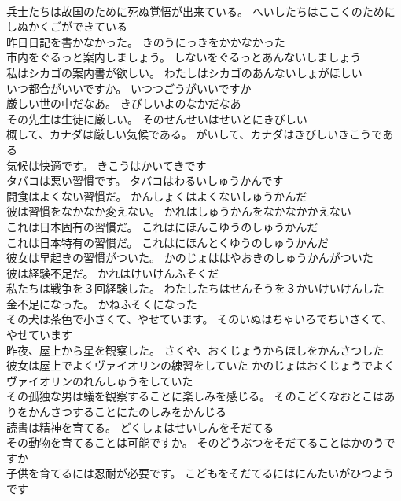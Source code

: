 \documentclass[8pt]{extreport}
\begin{document}
\begin{CJK}{UTF8}{min}
\\	兵士たちは故国のために死ぬ覚悟が出来ている。	へいしたちはここくのためにしぬかくごができている 
\\	昨日日記を書かなかった。	きのうにっきをかかなかった 
\\	市内をぐるっと案内しましょう。	しないをぐるっとあんないしましょう 
\\	私はシカゴの案内書が欲しい。	わたしはシカゴのあんないしょがほしい 
\\	いつ都合がいいですか。	いつつごうがいいですか 
\\	厳しい世の中だなあ。	きびしいよのなかだなあ 
\\	その先生は生徒に厳しい。	そのせんせいはせいとにきびしい 
\\	概して、カナダは厳しい気候である。	がいして、カナダはきびしいきこうである 
\\	気候は快適です。	きこうはかいてきです 
\\	タバコは悪い習慣です。	タバコはわるいしゅうかんです 
\\	間食はよくない習慣だ。	かんしょくはよくないしゅうかんだ 
\\	彼は習慣をなかなか変えない。	かれはしゅうかんをなかなかかえない 
\\	これは日本固有の習慣だ。	これはにほんこゆうのしゅうかんだ 
\\	これは日本特有の習慣だ。	これはにほんとくゆうのしゅうかんだ 
\\	彼女は早起きの習慣がついた。	かのじょははやおきのしゅうかんがついた 
\\	彼は経験不足だ。	かれはけいけんふそくだ 
\\	私たちは戦争を３回経験した。	わたしたちはせんそうを３かいけいけんした 
\\	金不足になった。	かねふそくになった 
\\	その犬は茶色で小さくて、やせています。	そのいぬはちゃいろでちいさくて、やせています 
\\	昨夜、屋上から星を観察した。	さくや、おくじょうからほしをかんさつした 
\\	彼女は屋上でよくヴァイオリンの練習をしていた	かのじょはおくじょうでよくヴァイオリンのれんしゅうをしていた 
\\	その孤独な男は蟻を観察することに楽しみを感じる。	そのこどくなおとこはありをかんさつすることにたのしみをかんじる 
\\	読書は精神を育てる。	どくしょはせいしんをそだてる 
\\	その動物を育てることは可能ですか。	そのどうぶつをそだてることはかのうですか 
\\	子供を育てるには忍耐が必要です。	こどもをそだてるにはにんたいがひつようです 

\end{CJK}
\end{document}
